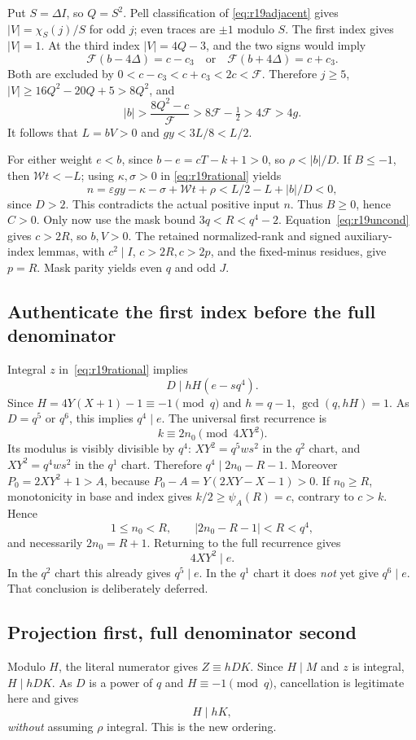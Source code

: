 Put $S=\Delta I$, so $Q=S^2$. Pell classification of
\eqref{eq:r19adjacent} gives $|V|=\chi_S(j)/S$ for odd $j$;
even traces are $\pm1$ modulo $S$. The first index gives $|V|=1$.
At the third index $|V|=4Q-3$, and the two signs would imply
\[
 \mathcal F(b-4\Delta)=c-c_3\quad\text{or}\quad
 \mathcal F(b+4\Delta)=c+c_3.
\]
Both are excluded by $0<c-c_3<c+c_3<2c<\mathcal F$.
Therefore $j\ge5$, $|V|\ge16Q^2-20Q+5>8Q^2$, and
\[
 |b|>\frac{8Q^2-c}{\mathcal F}>8\mathcal F-\tfrac12
 >4\mathcal F>4g.
\]
It follows that $L=bV>0$ and $gy<3L/8<L/2$.

For either weight $e<b$, since $b-e=cT-k+1>0$, so $\rho<|b|/D$.
If $B\le-1$, then $\mathcal Wt<-L$; using $\kappa,\sigma>0$ in
\eqref{eq:r19rational} yields
\[
 n=\varepsilon gy-\kappa-\sigma+\mathcal Wt+\rho
   <L/2-L+|b|/D<0,
\]
since $D>2$. This contradicts the actual positive input $n$.
Thus $B\ge0$, hence $C>0$. Only now use the mask bound
$3q<R<q^4-2$. Equation~\eqref{eq:r19uncond} gives $c>2R$, so $b,V>0$.
The retained normalized-rank and signed auxiliary-index lemmas, with
$c^2\mid I$, $c>2R,c>2p$, and the fixed-minus residues, give $p=R$.
Mask parity yields even $q$ and odd $J$.

\subsection{Authenticate the first index before the full denominator}
Integral $z$ in~\eqref{eq:r19rational} implies
\[
 D\mid hH(e-sq^4).
\]
Since $H=4Y(X+1)-1\equiv-1\pmod q$ and $h=q-1$,
$\gcd(q,hH)=1$. As $D=q^5$ or $q^6$, this implies $q^4\mid e$.
The universal first recurrence is
\[
 k\equiv2n_0\pmod{4XY^2}.
\]
Its modulus is visibly divisible by $q^4$: $XY^2=q^5ws^2$ in the
$q^2$ chart, and $XY^2=q^4ws^2$ in the $q^1$ chart.
Therefore $q^4\mid2n_0-R-1$. Moreover
$P_0=2XY^2+1>A$, because $P_0-A=Y(2XY-X-1)>0$.
If $n_0\ge R$, monotonicity in base and index gives
$k/2\ge\psi_A(R)=c$, contrary to $c>k$. Hence
\[
 1\le n_0<R,\qquad |2n_0-R-1|<R<q^4,
\]
and necessarily $2n_0=R+1$. Returning to the full recurrence gives
\begin{equation}
 4XY^2\mid e.\label{eq:r19fullrec}
\end{equation}
In the $q^2$ chart this already gives $q^5\mid e$.
In the $q^1$ chart it does \emph{not} yet give $q^6\mid e$.
That conclusion is deliberately deferred.

\subsection{Projection first, full denominator second}
Modulo $H$, the literal numerator gives $Z\equiv hDK$. Since $H\mid M$
and $z$ is integral, $H\mid hDK$. As $D$ is a power of $q$ and
$H\equiv-1\pmod q$, cancellation is legitimate here and gives
\begin{equation}
 H\mid hK,\label{eq:r19projectionpremise}
\end{equation}
\emph{without} assuming $\rho$ integral. This is the new ordering.

